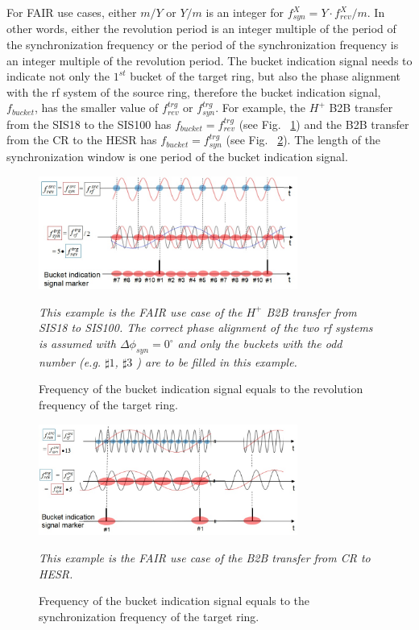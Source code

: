 For FAIR use cases, either $m/Y$ or $Y/m$ is an integer for $f_\mathit{syn}^{X}=Y\cdot f_\mathit{rev}^{X}/m$. In other words, either the revolution period is an integer multiple of the period of the synchronization frequency or the period of the synchronization frequency is an integer multiple of the revolution period. The bucket indication signal needs to indicate not only the $1^\mathit{st}$ bucket of the target ring, but also the phase alignment with the rf system of the source ring, therefore the bucket indication signal, $f_\mathit{bucket}$, has the smaller value of $f_\mathit{rev}^{trg}$ or $f_\mathit{syn}^{trg}$. For example, the $H^+$ B2B transfer from the SIS18 to the SIS100 has $f_\mathit{bucket}=f_\mathit{rev}^{trg}$ (see Fig. ~\ref{bucket_label_occurrence}) and the B2B transfer from the CR to the HESR has $f_\mathit{bucket}=f_\mathit{syn}^{trg}$ (see Fig. ~\ref{bucket_label_occurrence1}). The length of the synchronization window is one period of the bucket indication signal.
\begin{figure}[!htb]
   \centering   
   \includegraphics*[width=85mm]{bucket_label_occurrence.jpg}
   \caption{Frequency of the bucket indication signal equals to the revolution frequency of the target ring.}
	{\textsl{\small{This example is the FAIR use case of the $H^+$ B2B transfer from SIS18 to SIS100. The correct phase alignment of the two rf systems is assumed with $\Delta\phi_\mathit{syn}=0^\circ$ and only the buckets with the odd number (e.g. $\sharp1$, $\sharp3$ ) are to be filled in this example.}}}
   \label{bucket_label_occurrence}
\end{figure}

\begin{figure}[!htb]
   \centering   
   \includegraphics*[width=85mm]{bucket_label_occurrence1.jpg}
   \caption{Frequency of the bucket indication signal equals to the synchronization frequency of the target ring.}
	{\textsl{\small{This example is the FAIR use case of the B2B transfer from CR to HESR. }}}
   \label{bucket_label_occurrence1}
\end{figure}

